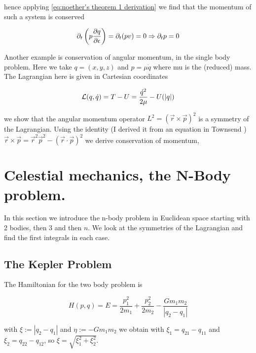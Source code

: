 \documentclass[12pt]{article}
\begin{document}
hence applying \eqref{eq:noether's theorem 1 derivation} we find that the momentum of such a system is conserved

\begin{equation}\label{eq:momentum conserved}
    \partial_t \left(p\frac{\partial q}{\partial \epsilon}\right) = \partial_t (pv) = 0 \Rightarrow \partial_t p = 0
\end{equation}

 Another example is conservation of angular momentum, in the single body problem. Here we take $q = (x,y,z)$ and $p = \mu \dot q$ where mu is the (reduced) mass. The Lagrangian here is given in Cartesian coordinates 

\begin{equation}\label{eq:lagrangian one body problem}
    \mathcal L(q,\dot q) = T - U = \frac{\dot q^2}{2\mu} - U(|q|)
\end{equation}

we show that the angular momentum operator $L^2 = \left(\vec{r} \times \vec{p}\right)^2$ is a symmetry of the Lagrangian. Using the identity (I derived it from an equation in Townsend \cite{Townsend}) $\vec r\times\vec p = \vec r^2\vec p^2 - (\vec r\cdot \vec p)^2$ we derive conservation of momentum, 

\section{Celestial mechanics, the N-Body problem.}

In this section we introduce the n-body problem in Euclidean space starting with 2 bodies, then 3 and then $n$. We look at the symmetries of the Lagrangian and find the first integrals in each case. 

\subsection{The Kepler Problem}

The Hamiltonian for the two body problem is

\begin{equation}\label{eq:hamiltonian kepler}
    H(p,q) = E = \frac{p_1^2}{2m_1} + \frac{p_2^2}{2m_2} - \frac{G m_1m_2}{|q_2-q_1|}
\end{equation}

with $\xi := |q_2-q_1|$ and $\eta := -Gm_1m_2$ we obtain with $\xi_1 = q_{21} - q_{11}$ and $\xi_2 = q_{22} - q_{12}$, so $\xi = \sqrt{\xi_1^2 + \xi_2^2}$. 
\end{document}
